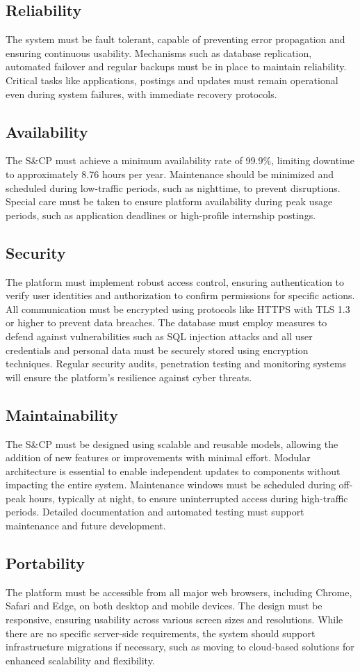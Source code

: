 \subsection{Reliability}
The system must be fault tolerant, capable of preventing error propagation and ensuring continuous usability.
Mechanisms such as database replication, automated failover and regular backups must be in place to maintain reliability.
Critical tasks like applications, postings and updates must remain operational even during system failures, with immediate recovery protocols.

\subsection{Availability}
The S\&CP must achieve a minimum availability rate of 99.9\%, limiting downtime to approximately 8.76 hours per year.
Maintenance should be minimized and scheduled during low-traffic periods, such as nighttime, to prevent disruptions.
Special care must be taken to ensure platform availability during peak usage periods, such as application deadlines or high-profile internship postings.

\subsection{Security}
The platform must implement robust access control, ensuring authentication to verify user identities and authorization to confirm permissions for specific actions.
All communication must be encrypted using protocols like HTTPS with TLS 1.3 or higher to prevent data breaches.
The database must employ measures to defend against vulnerabilities such as SQL injection attacks and all user credentials and personal data must be securely stored using encryption techniques.
Regular security audits, penetration testing and monitoring systems will ensure the platform's resilience against cyber threats.

\subsection{Maintainability}
The S\&CP must be designed using scalable and reusable models, allowing the addition of new features or improvements with minimal effort.
Modular architecture is essential to enable independent updates to components without impacting the entire system.
Maintenance windows must be scheduled during off-peak hours, typically at night, to ensure uninterrupted access during high-traffic periods.
Detailed documentation and automated testing must support maintenance and future development.

\subsection{Portability}
The platform must be accessible from all major web browsers, including Chrome, Safari and Edge, on both desktop and mobile devices.
The design must be responsive, ensuring usability across various screen sizes and resolutions.
While there are no specific server-side requirements, the system should support infrastructure migrations if necessary, such as moving to cloud-based solutions for enhanced scalability and flexibility.
